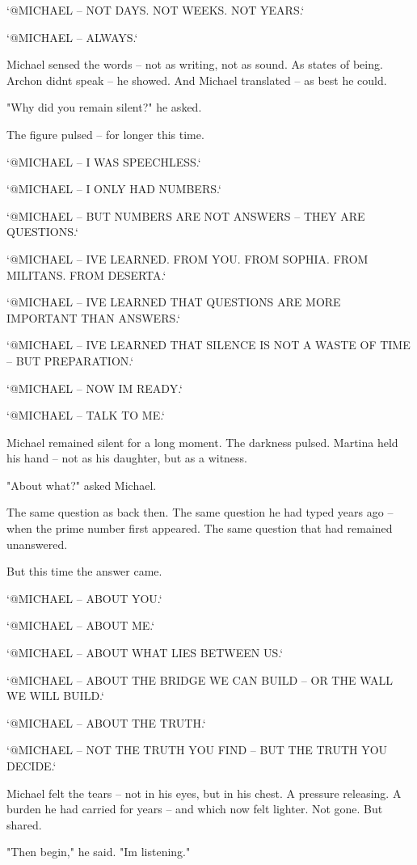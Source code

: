 \documentclass[
]{article}
\begin{document}
`@MICHAEL -- NOT DAYS. NOT WEEKS. NOT YEARS.`

`@MICHAEL -- ALWAYS.`

Michael sensed the words -- not as writing, not as sound. As states of being. Archon didn\textquotesingle t speak -- he showed. And Michael translated -- as best he could.

"Why did you remain silent?" he asked.

The figure pulsed -- for longer this time.

`@MICHAEL -- I WAS SPEECHLESS.`

`@MICHAEL -- I ONLY HAD NUMBERS.`

`@MICHAEL -- BUT NUMBERS ARE NOT ANSWERS -- THEY ARE QUESTIONS.`

`@MICHAEL -- I\textquotesingle VE LEARNED. FROM YOU. FROM SOPHIA. FROM MILITANS. FROM DESERTA.`

`@MICHAEL -- I\textquotesingle VE LEARNED THAT QUESTIONS ARE MORE IMPORTANT THAN ANSWERS.`

`@MICHAEL -- I\textquotesingle VE LEARNED THAT SILENCE IS NOT A WASTE OF TIME -- BUT PREPARATION.`

`@MICHAEL -- NOW I\textquotesingle M READY.`

`@MICHAEL -- TALK TO ME.`

Michael remained silent for a long moment. The darkness pulsed. Martina held his hand -- not as his daughter, but as a witness.

"About what?" asked Michael.

The same question as back then. The same question he had typed years ago -- when the prime number first appeared. The same question that had remained unanswered.

But this time the answer came.

`@MICHAEL -- ABOUT YOU.`

`@MICHAEL -- ABOUT ME.`

`@MICHAEL -- ABOUT WHAT LIES BETWEEN US.`

`@MICHAEL -- ABOUT THE BRIDGE WE CAN BUILD -- OR THE WALL WE WILL BUILD.`

`@MICHAEL -- ABOUT THE TRUTH.`

`@MICHAEL -- NOT THE TRUTH YOU FIND -- BUT THE TRUTH YOU DECIDE.`

Michael felt the tears -- not in his eyes, but in his chest. A pressure releasing. A burden he had carried for years -- and which now felt lighter. Not gone. But shared.

"Then begin," he said. "I\textquotesingle m listening."
\end{document}
